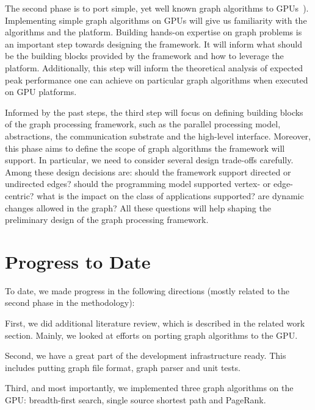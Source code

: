 \documentclass{acm_proc_article-sp}[12pt]
\begin{document}
The second phase is to port simple, yet well known graph algorithms to GPUs~\cite{Meyer2003,Harish2007,Malewicz2009,Sungpack2010}). Implementing simple graph algorithms on GPUs will give us familiarity with the algorithms and the platform. Building hands-on expertise on graph problems is an important step towards designing the framework. It will inform what should be the building blocks provided by the framework and how to leverage the platform. Additionally, this step will inform the theoretical analysis of expected peak performance one can achieve on particular graph algorithms when executed on GPU platforms.

Informed by the past steps, the third step will focus on defining building blocks of the graph processing framework, such as the parallel processing model, abstractions, the communication substrate and the high-level interface. Moreover, this phase aims to define the scope of graph algorithms the framework will support. In particular, we need to consider several design trade-offs carefully. Among these design decisions are: should the framework support directed or undirected edges? should the programming model supported vertex- or edge-centric? what is the impact on the class of applications supported? are dynamic changes allowed in the graph? All these questions will help shaping the preliminary design of the graph processing framework.

\section{Progress to Date}
\label{sec:progress}

To date, we made progress in the following directions (mostly related to the second phase in the methodology):

First, we did additional literature review, which is described in the related work section. Mainly, we looked at efforts on porting graph algorithms to the GPU.

Second, we have a great part of the development infrastructure ready. This includes putting graph file format, graph parser and unit tests.

Third, and most importantly, we implemented three graph algorithms on the GPU: breadth-first search, single source shortest path and PageRank. 
\end{document}
